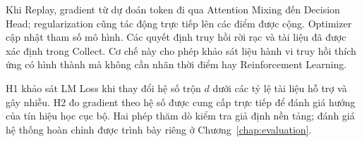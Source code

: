 Khi Replay, gradient từ dự đoán token đi qua Attention Mixing đến Decision Head; regularization cũng tác động trực tiếp lên các điểm được cộng. Optimizer cập nhật tham số mô hình. Các quyết định truy hồi rời rạc và tài liệu đã được xác định trong Collect. Cơ chế này cho phép khảo sát liệu hành vi truy hồi thích ứng có hình thành mà không cần nhãn thời điểm hay Reinforcement Learning.

H1 khảo sát LM Loss khi thay đổi hệ số trộn \(d\) dưới các tỷ lệ tài liệu hỗ trợ và gây nhiễu. H2 đo gradient theo hệ số được cung cấp trực tiếp để đánh giá hướng của tín hiệu học cục bộ. Hai phép thăm dò kiểm tra giả định nền tảng; đánh giá hệ thống hoàn chỉnh được trình bày riêng ở Chương~\ref{chap:evaluation}.

